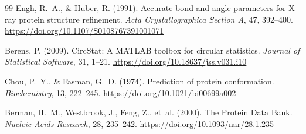 \documentclass[11pt,a4paper]{article}
\begin{document}
\begin{thebibliography}{99}
Engh, R.~A., \& Huber, R. (1991).
Accurate bond and angle parameters for X-ray protein structure refinement.
\textit{Acta Crystallographica Section A}, 47, 392--400.
\url{https://doi.org/10.1107/S0108767391001071}

Berens, P. (2009).
CircStat: A MATLAB toolbox for circular statistics.
\textit{Journal of Statistical Software}, 31, 1--21.
\url{https://doi.org/10.18637/jss.v031.i10}

Chou, P.~Y., \& Fasman, G.~D. (1974).
Prediction of protein conformation.
\textit{Biochemistry}, 13, 222--245.
\url{https://doi.org/10.1021/bi00699a002}

Berman, H.~M., Westbrook, J., Feng, Z., et~al. (2000).
The Protein Data Bank.
\textit{Nucleic Acids Research}, 28, 235--242.
\url{https://doi.org/10.1093/nar/28.1.235}

\end{thebibliography}
\end{document}
